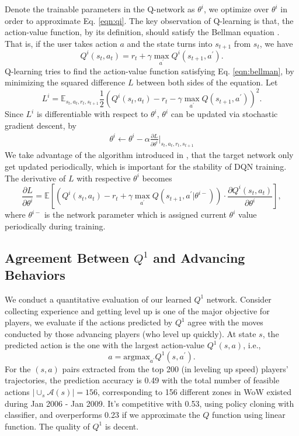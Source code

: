 \documentclass[a4paper]{article}
\begin{document}
Denote the trainable parameters in the Q-network as $\theta^i$, we optimize over $\theta^i$ in order to approximate Eq. \eqref{eqn:qi}. The key observation of Q-learning is that, the action-value function, by its definition, should satisfy the Bellman equation \cite{}. That is, if the user takes action $a$ and the state turns into $s_{t+1}$ from $s_t$, we have
\begin{equation}
Q^i(s_t,a_t)=r_{t} + \gamma \max_{a^\prime}Q^i(s_{t+1}, a^\prime). \label{eqn:bellman}
\end{equation}
Q-learning tries to find the action-value function satisfying Eq. \eqref{eqn:bellman}, by minimizing the squared difference $L$ between both sides of the equation. Let
\begin{equation*}
L^i=\mathbb{E}_{s_t, a_t, r_t, s_{t+1}} \frac{1}{2}(Q^i(s_t,a_t)- r_{t} - \gamma\max_{a^\prime}Q(s_{t+1}, a^\prime))^2.
\end{equation*}
Since $L^i$ is differentiable with respect to $\theta^i$, $\theta^i$ can be updated via stochastic gradient descent, by
\begin{eqnarray*}
\theta^i \leftarrow \theta^i - \alpha\frac{\partial L}{\partial \theta^i}\Big|_{s_t, a_t, r_t, s_{t+1}}
\end{eqnarray*}
We take advantage of the algorithm introduced in \cite{}, that the target network only get updated periodically, which is important for the stability of DQN training. The derivative of $L$ with respective $\theta^i$ becomes
$$\frac{\partial L}{\partial \theta^i} = \mathbb{E}\left[ (Q^i(s_t,a_t)- r_{t} + \gamma\max_{a^\prime}Q(s_{t+1}, a^\prime | \theta^{i -}))\cdot \frac{\partial{Q^i(s_t,a_t)}}{\partial{\theta^i}}\right],$$
where $\theta^{i-}$ is the network parameter which is assigned current $\theta^i$ value periodically during training.

\subsection{Agreement Between $Q^1$ and Advancing Behaviors}

We conduct a quantitative evaluation of our learned $Q^1$ network. Consider collecting experience and getting level up is one of the major objective for players, we evaluate if the actions predicted by $Q^1$ agree with the moves conducted by those advancing players (who level up quickly). At state $s$, the predicted action is the one with the largest action-value $Q^1(s,a)$, i.e.,
\begin{equation*}
a = \text{argmax}_{a^\prime}Q^1(s,a^\prime).
\end{equation*}
For the $(s,a)$ pairs extracted from the top 200 (in leveling up speed) players' trajectories, the prediction accuracy is 0.49 with the total number of feasible actions $|\cup_s\mathcal{A}(s)|=156$, corresponding to 156 different zones in WoW existed during Jan 2006 - Jan 2009. It's competitive with 0.53, using policy cloning \cite{} with classifier, and overperforms 0.23 if we approximate the $Q$ function using linear function. The quality of $Q^1$ is decent.
\end{document}
